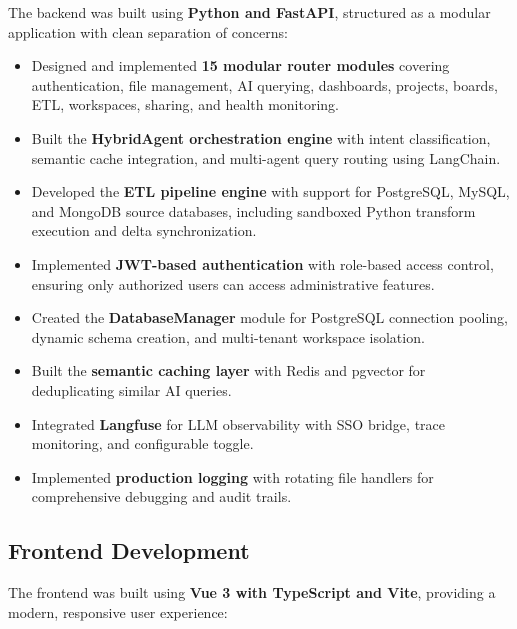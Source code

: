 \documentclass[12pt,a4paper]{report}
\begin{document}
The backend was built using \textbf{Python and FastAPI}, structured as a modular application with clean separation of concerns:

\begin{itemize}[leftmargin=1.5cm]
    \item Designed and implemented \textbf{15 modular router modules} covering authentication, file management, AI querying, dashboards, projects, boards, ETL, workspaces, sharing, and health monitoring.
    \item Built the \textbf{HybridAgent orchestration engine} with intent classification, semantic cache integration, and multi-agent query routing using LangChain.
    \item Developed the \textbf{ETL pipeline engine} with support for PostgreSQL, MySQL, and MongoDB source databases, including sandboxed Python transform execution and delta synchronization.
    \item Implemented \textbf{JWT-based authentication} with role-based access control, ensuring only authorized users can access administrative features.
    \item Created the \textbf{DatabaseManager} module for PostgreSQL connection pooling, dynamic schema creation, and multi-tenant workspace isolation.
    \item Built the \textbf{semantic caching layer} with Redis and pgvector for deduplicating similar AI queries.
    \item Integrated \textbf{Langfuse} for LLM observability with SSO bridge, trace monitoring, and configurable toggle.
    \item Implemented \textbf{production logging} with rotating file handlers for comprehensive debugging and audit trails.
\end{itemize}

\subsection{Frontend Development}

The frontend was built using \textbf{Vue 3 with TypeScript and Vite}, providing a modern, responsive user experience:
\end{document}

